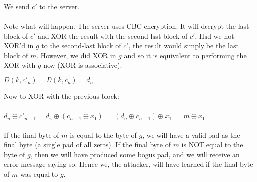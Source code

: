 \documentclass{article}
\begin{document}
We send $c'$ to the server. 
\\
\\
Note what will happen. The server uses CBC encryption. It will decrypt the last block of $c'$ and XOR the result with the second last block of $c'$. Had we not XOR'd in $g$ to the second-last block of $c'$, the result would simply be the last block of $m$. However, we did XOR in $g$ and so it is equivalent to performing the XOR with $g$ now (XOR is associative). 

$D(k, c'_n) = D(k, c_n) = d_n$

Now to XOR with the previous block:
\\
\\
$d_n \oplus c'_{n-1} = d_n \oplus (c_{n-1} \oplus x_1)$
$ = (d_n \oplus c_{n-1}) \oplus x_1$
$ = m \oplus x_1$
\\
\\
If the final byte of $m$ is equal to the byte of $g$, we will have a valid pad as the final byte (a single pad of all zeros). If the final byte of $m$ is NOT equal to the byte of $g$, then we will have produced some bogus pad, and we will receive an error message saying so. Hence we, the attacker, will have learned if the final byte of $m$ was equal to $g$.
\end{document}
